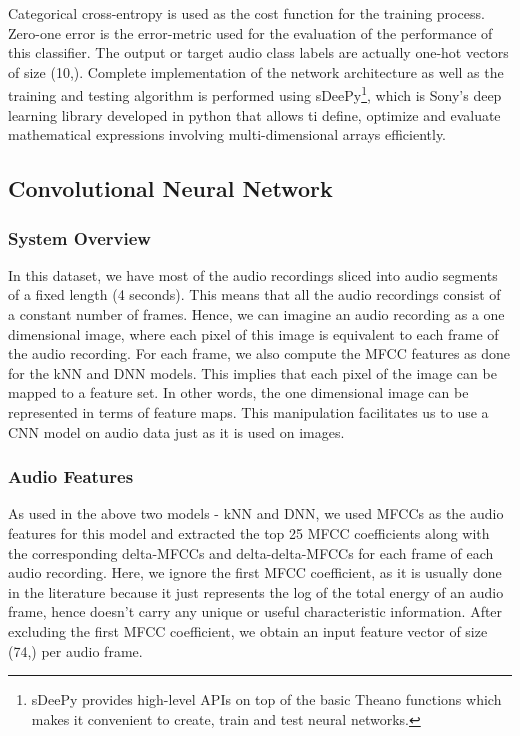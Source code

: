 Categorical cross-entropy is used as the cost function for the training process. Zero-one error is the error-metric used for the evaluation of the performance of this classifier. The output or target audio class labels are actually one-hot vectors of size (10,). Complete implementation of the network architecture as well as the training and testing algorithm is performed using sDeePy\footnote{sDeePy provides high-level APIs on top of the basic Theano functions which makes it convenient to create, train and test neural networks.}, which is Sony's deep learning library developed in python that allows ti define, optimize and evaluate mathematical expressions involving multi-dimensional arrays efficiently.

\subsection{Convolutional Neural Network}

\subsubsection{System Overview}
In this dataset, we have most of the audio recordings sliced into audio segments of a fixed length (4 seconds). This means that all the audio recordings consist of a constant number of frames. Hence, we can imagine an audio recording as a one dimensional image, where each pixel of this image is equivalent to each frame of the audio recording. For each frame, we also compute the MFCC features as done for the kNN and DNN models. This implies that each pixel of the image can be mapped to a feature set. In other words, the one dimensional image can be represented in terms of feature maps. This manipulation facilitates us to use a CNN model on audio data just as it is used on images.

\subsubsection{Audio Features}
As used in the above two models - kNN and DNN, we used MFCCs as the audio features for this model and extracted the top 25 MFCC coefficients along with the corresponding delta-MFCCs and delta-delta-MFCCs for each frame of each audio recording. Here, we ignore the first MFCC coefficient, as it is usually done in the literature because it just represents the log of the total energy of an audio frame, hence doesn't carry any unique or useful characteristic information. After excluding the first MFCC coefficient, we obtain an input feature vector of size (74,) per audio frame. 

